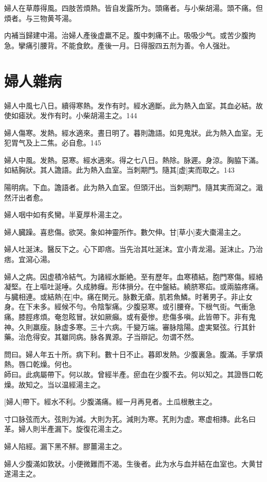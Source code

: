 \documentclass[12pt,oneside,UTF8,b5paper]{ctexbook}她她她她她她她
\begin{document}
婦人在草蓐得風。四肢苦煩熱。皆自发露所为。頭痛者。与小柴胡湯。頭不痛。但煩者。与三物黄芩湯。

内補当歸建中湯。治婦人產後虚羸不足。腹中刺痛不止。吸吸少气。或苦少腹拘急。攣痛引腰背。不能食飲。產後一月。日得服四五剂为善。令人强壯。

\chapter{婦人雜病}

婦人中風七八日。續得寒熱。发作有时。經水適斷。此为熱入血室。其血必結。故使如瘧狀。发作有时。小柴胡湯主之。144

婦人傷寒。发熱。經水適來。晝日明了。暮則譫語。如見鬼狀。此为熱入血室。无犯胃气及上二焦。必自愈。145

婦人中風。发熱。惡寒。經水適來。得之七八日。熱除。脉遲。身涼。胸脇下滿。如結胸狀。其人譫語。此为熱入血室。当刺期門。隨其[虚]実而取之。143

陽明病。下血。譫語者。此为熱入血室。但頭汗出。当刺期門。隨其実而瀉之。濈然汗出者愈。

婦人咽中如有炙臠。半夏厚朴湯主之。

婦人臓躁。喜悲傷。欲哭。象如神靈所作。數欠伸。甘[草小]麦大棗湯主之。

婦人吐涎沫。醫反下之。心下即痞。当先治其吐涎沫。宜小青龙湯。涎沫止。乃治痞。宜瀉心湯。

婦人之病。因虚積冷結气。为諸經水斷絶。至有歷年。血寒積結。胞門寒傷。經絡凝堅。在上嘔吐涎唾。久成肺癰。形体損分。在中盤結。繞脐寒疝。或兩脇疼痛。与臓相連。或結熱[在]中。痛在関元。脉數无瘡。肌若魚鱗。时著男子。非止女身。在下未多。經候不勻。令陰掣痛。少腹惡寒。或引腰脊。下根气街。气衝急痛。膝脛疼煩。奄忽眩冒。狀如厥癲。或有憂惨。悲傷多嗔。此皆帶下。非有鬼神。久則羸瘦。脉虚多寒。三十六病。千變万端。審脉陰陽。虚実緊弦。行其針藥。治危得安。其雖同病。脉各異源。子当辯記。勿谓不然。

問曰。婦人年五十所。病下利。數十日不止。暮即发熱。少腹裏急。腹滿。手掌煩熱。唇口乾燥。何也。\\
師曰。此病屬帶下。何以故。曾經半產。瘀血在少腹不去。何以知之。其證唇口乾燥。故知之。当以温經湯主之。

[婦人]帶下。經水不利。少腹滿痛。經一月再見者。土瓜根散主之。

寸口脉弦而大。弦則为減。大則为芤。減則为寒。芤則为虚。寒虚相摶。此名曰革。婦人則半產漏下。旋復花湯主之。

婦人陷經。漏下黑不觧。膠薑湯主之。

婦人少腹滿如敦狀。小便微難而不渴。生後者。此为水与血并結在血室也。大黄甘遂湯主之。
\end{document}
